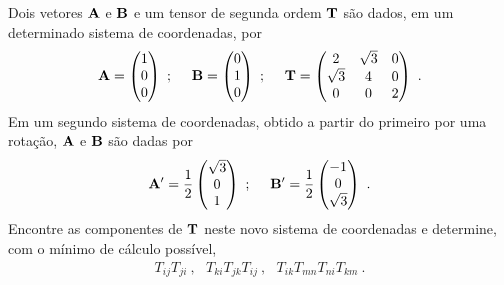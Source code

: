 \documentclass[a4paper,12pt]{article}
\begin{document}
\indent \par Dois vetores ${\bf{A}}$ e ${\bf{B}}$ e um tensor de segunda ordem ${\bf{T}}$ são dados, em um determinado sistema de coordenadas, por
%
\begin{eqnarray}
  \nonumber
  {\bf{A}}= 
  \begin{pmatrix}
 1 \\
 0 \\
 0
\end{pmatrix}~; ~~~~
{\bf{B}}= 
  \begin{pmatrix}
 0 \\
 1 \\
 0 
\end{pmatrix}~; ~~~~
{\bf{T}}= 
  \begin{pmatrix}
 2 & \sqrt{3} & 0 \\
 \sqrt{3} & 4 & 0 \\
 0 & 0 & 2
 
\end{pmatrix}~.
%
 \end{eqnarray}
%
\noindent Em um segundo sistema de coordenadas, obtido a partir do primeiro por uma rotação, ${\bf{A}}$ e ${\bf{B}}$ são dadas por
%
\begin{eqnarray}
  \nonumber
  {\bf{A'}}=\frac{1}{2} 
  \begin{pmatrix}
 \sqrt{3} \\
 0 \\
 1
\end{pmatrix}~; ~~~~
{\bf{B'}}=\frac{1}{2} 
  \begin{pmatrix}
 -1 \\
 0 \\
 \sqrt{3}
 \end{pmatrix}~.
%
 \end{eqnarray}
%
\noindent Encontre as componentes de ${\bf{T}}$ neste novo sistema de coordenadas e determine, com o mínimo de cálculo possível, 
%
\begin{eqnarray}
  \nonumber
  T_{ij}T_{ji} ~,~~~ T_{ki}T_{jk}T_{ij} ~,~~~ T_{ik}T_{mn}T_{ni}T_{km} ~.
 \end{eqnarray}\\
%

\end{document}

